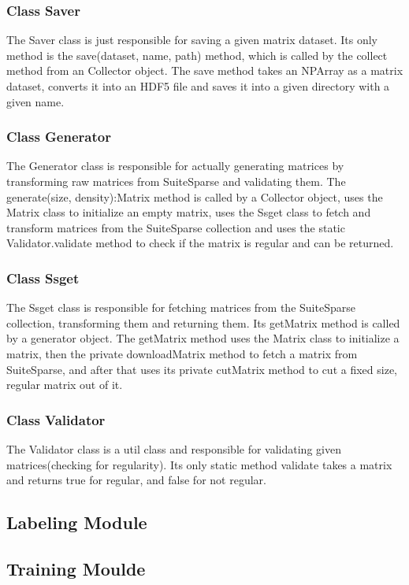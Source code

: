 \documentclass[parskip=full]{scrartcl}
\begin{document}
\subsubsection{Class Saver}
The Saver class is just responsible for saving a given matrix dataset. Its only method is the save(dataset, name, path) method, which
is called by the collect method from an Collector object. The save method takes an NPArray as a matrix dataset, converts it into an HDF5 file and saves it into a given directory with a given name.

\subsubsection{Class Generator}
The Generator class is responsible for actually generating matrices by transforming raw matrices from SuiteSparse and validating them.
The generate(size, density):Matrix method is called by a Collector object, uses the Matrix class to initialize an empty matrix, uses the Ssget class to fetch and transform matrices from the SuiteSparse collection and uses the static Validator.validate method to check if the matrix is regular and can be returned.

\subsubsection{Class Ssget}
The Ssget class is responsible for fetching matrices from the SuiteSparse collection, transforming them and returning them.
Its getMatrix method is called by a generator object. The getMatrix method uses the Matrix class to initialize a matrix, then the private downloadMatrix method to fetch a matrix from SuiteSparse, and after that uses its private cutMatrix method to cut a fixed size, regular matrix out of it.

\subsubsection{Class Validator}
The Validator class is a util class and responsible for validating given matrices(checking for regularity). Its only static method validate takes a matrix and returns true for regular, and false for not regular.
\subsection{Labeling Module}
\subsection{Training Moulde}
\end{document}

